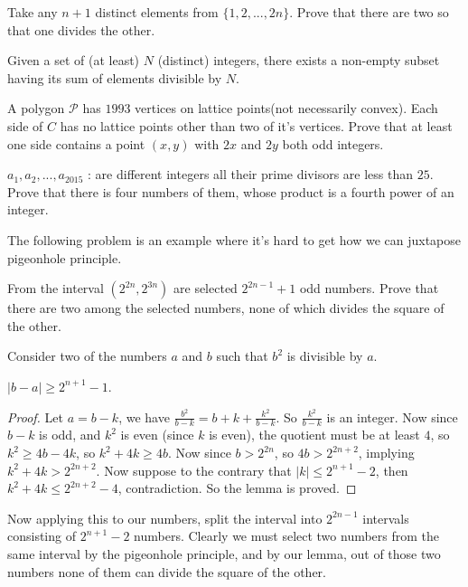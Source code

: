 \documentclass[nt_billal_v1.tex]{subfile}
\begin{document}
	
	\begin{problem}
		Take any $n+1$ distinct elements from $\{1,2,...,2n\}$. Prove that there are two so that one divides the other.
	\end{problem}
	
	
	\begin{problem}
		Given a set of (at least) $N$ (distinct) integers, there exists a non-empty subset having its sum of elements divisible by $N$.
	\end{problem}
	
	
	\begin{problem}
		A polygon $\mathcal{P}$ has $1993$ vertices on lattice points(not necessarily convex). Each side of $C$ has no lattice points other than two of it's vertices. Prove that at least one side contains a point $(x,y)$ with $2x$ and $2y$ both odd integers.
	\end{problem}
	
	\begin{solution}
		
	\end{solution}

	\begin{problem}
		$a_1,a_2,...,a_{2015}$ : are different integers all their prime divisors are less than $25$. Prove that there is four numbers of them, whose product is a fourth power of an integer.
	\end{problem}
	
	The following problem is an example where it's hard to get how we can juxtapose pigeonhole principle.
	
	\begin{problem}
		From the interval $(2^{2n},2^{3n})$ are selected $2^{2n-1}+1$ odd numbers. Prove that there are two among the selected numbers, none of which divides the square of the other.
	\end{problem}
	
	\begin{solution}
		Consider two of the numbers $a$ and $b$ such that $b^2$ is divisible by $a$.
		\begin{lemma}
			$|b-a| \ge 2^{n+1}-1$.
		\end{lemma}
		
		\begin{proof}
			Let $a=b-k$, we have $\frac{b^2}{b-k}=b+k+\frac{k^2}{b-k}$. So $\frac{k^2}{b-k}$ is an integer. Now since $b-k$ is odd, and $k^2$ is even (since          $k$ is even), the quotient must be at least $4$, so $k^2 \ge 4b-4k$, so $k^2+4k\ge 4b$.
			Now since $b>2^{2n}$, so $4b>2^{2n+2}$, implying $k^2+4k>2^{2n+2}$. Now suppose to the contrary that $|k|\le 2^{n+1}-2$, then $k^2+4k\le 2^{2n+2}-4$, contradiction. So the lemma is proved.
		\end{proof}
		
		Now applying this to our numbers, split the interval into $2^{2n-1}$ intervals consisting of $2^{n+1}-2$ numbers. Clearly we must select two numbers from the same interval by the pigeonhole principle, and by our lemma, out of those two numbers none of them can divide the square of the other.
	\end{solution}
\end{document}
